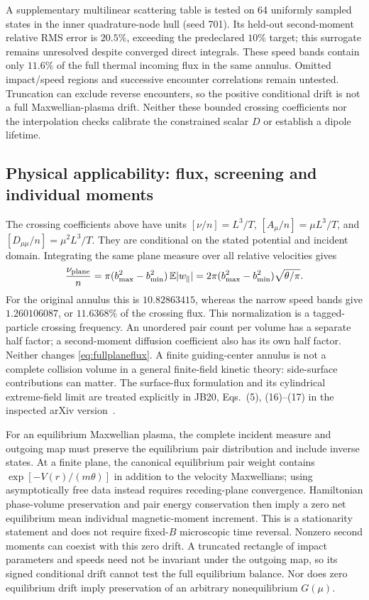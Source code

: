 \documentclass[11pt,letterpaper]{article}
\begin{document}
A supplementary multilinear scattering table is tested on 64 uniformly
sampled states in the inner quadrature-node hull (seed 701).
Its held-out second-moment relative RMS error is $20.5\%$, exceeding the
predeclared $10\%$ target; this surrogate remains unresolved despite converged
direct integrals. These speed bands contain only $11.6\%$ of the full thermal
incoming flux in the same annulus. Omitted impact/speed regions and successive
encounter correlations remain untested. Truncation can exclude reverse
encounters, so the positive conditional drift is not a full Maxwellian-plasma
drift. Neither these bounded crossing coefficients nor the interpolation
checks calibrate the constrained scalar $D$ or establish a dipole lifetime.


\subsection*{Physical applicability: flux, screening and individual moments}

The crossing coefficients above have units
$[\nu/n]=L^3/T$, $[A_\mu/n]=\mu L^3/T$, and
$[D_{\mu\mu}/n]=\mu^2L^3/T$. They are conditional on the stated
potential and incident domain. Integrating the same plane measure over all
relative velocities gives
\begin{equation}
 \frac{\nu_{\rm plane}}n
 =\pi(b_{\max}^2-b_{\min}^2)\,\mathbb E|w_\parallel|
 =2\pi(b_{\max}^2-b_{\min}^2)\sqrt{\theta/\pi}.
 \label{eq:fullplaneflux}
\end{equation}
For the original annulus this is $10.82863415$, whereas the narrow speed
bands give $1.260106087$, or $11.6368\%$ of the crossing flux. This
normalization is a tagged-particle crossing frequency. An unordered pair
count per volume has a separate half factor; a second-moment diffusion
coefficient also has its own half factor. Neither changes
\eqref{eq:fullplaneflux}. A finite guiding-center annulus is not a complete
collision volume in a general finite-field kinetic theory: side-surface
contributions can matter. The surface-flux formulation and its cylindrical
extreme-field limit are treated explicitly in JB20, Eqs.~(5), (16)--(17)
in the inspected arXiv version~\cite{JB20}.

For an equilibrium Maxwellian plasma, the complete incident measure and
outgoing map must preserve the equilibrium pair distribution and include
inverse states. At a finite plane, the canonical equilibrium pair weight
contains $\exp[-V(r)/(m\theta)]$ in addition to the velocity Maxwellians;
using asymptotically free data instead requires receding-plane convergence.
Hamiltonian phase-volume preservation and pair energy conservation then
imply a zero net equilibrium mean individual magnetic-moment increment.
This is a stationarity statement and does not require fixed-$B$ microscopic
time reversal. Nonzero second moments can coexist with this zero drift.
A truncated rectangle of impact parameters and speeds need not be invariant
under the outgoing map, so its signed conditional drift cannot test the
full equilibrium balance. Nor does zero equilibrium drift imply preservation
of an arbitrary nonequilibrium $G(\mu)$.
\end{document}
